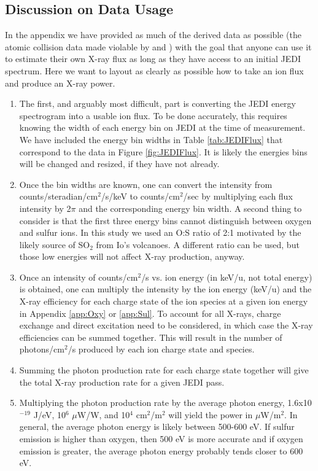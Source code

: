 \documentclass[draft]{agujournal2018}
\begin{document}
\subsection{Discussion on Data Usage}

In the appendix we have provided as much of the derived data as possible (the atomic collision data made violable by \citet{schultz2019} and \citet{gharibnejad2019}) with the goal that anyone can use it to estimate their own X-ray flux as long as they have access to an initial JEDI spectrum.
Here we want to layout as clearly as possible how to take an ion flux and produce an X-ray power.

\begin{enumerate}
    \item The first, and arguably most difficult, part is converting the JEDI energy spectrogram into a usable ion flux.
    To be done accurately, this requires knowing the width of each energy bin on JEDI at the time of measurement.
    We have included the energy bin widths in Table \ref{tab:JEDIFlux} that correspond to the data in Figure \ref{fig:JEDIFlux}.
    It is likely the energies bins will be changed and resized, if they have not already.
    \item Once the bin widths are known, one can convert the intensity from counts/steradian/cm$^2$/s/keV to counts/cm$^2$/sec by multiplying each flux intensity by 2$\pi$ and the corresponding energy bin width.
    A second thing to consider is that the first three energy bins cannot distinguish between oxygen and sulfur ions.
    In this study we used an O:S ratio of 2:1 motivated by the likely source of SO$_2$ from Io's volcanoes.
    A different ratio can be used, but those low energies will not affect X-ray production, anyway.
    \item Once an intensity of counts/cm$^2$/s vs. ion energy (in keV/u, not total energy) is obtained, one can multiply the intensity by the ion energy (keV/u) and the X-ray efficiency for each charge state of the ion species at a given ion energy in Appendix \ref{app:Oxy} or \ref{app:Sul}.
    To account for all X-rays, charge exchange and direct excitation need to be considered, in which case the X-ray efficiencies can be summed together.
    This will result in the number of photons/cm$^2$/s produced by each ion charge state and species.
    \item Summing the photon production rate for each charge state together will give the total X-ray production rate  for a given JEDI pass.
    \item Multiplying the photon production rate by the average photon energy, 1.6x10$^{-19}$ J/eV, 10$^6$ $\mu$W/W, and 10$^4$ cm$^2$/m$^2$ will yield the power in $\mu$W/m$^2$.
    In general, the average photon energy is likely between 500-600 eV.
    If sulfur emission is higher than oxygen, then 500 eV is more accurate and if oxygen emission is greater, the average photon energy probably tends closer to 600 eV.
\end{enumerate}
\end{document}
